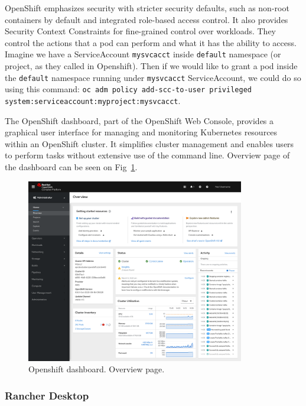 OpenShift emphasizes security with stricter security defaults, such as non-root containers by default and integrated role-based access control. It also provides Security Context Constraints for fine-grained control over workloads. They control the actions that a pod can perform and what it has the ability to access. Imagine we have a ServiceAccount \lstinline{mysvcacct} inside \lstinline{default} namespace (or project, as they called in Openshift). Then if we would like to grant a pod inside the \lstinline{default} namespace running under \lstinline{mysvcacct} ServiceAccount, we could do so using this command: \lstinline{oc adm policy add-scc-to-user privileged system:serviceaccount:myproject:mysvcacct}.

The OpenShift dashboard, part of the OpenShift Web Console, provides a graphical user interface for managing and monitoring Kubernetes resources within an OpenShift cluster. It simplifies cluster management and enables users to perform tasks without extensive use of the command line. Overview page of the dashboard can be seen on Fig~\ref{img:openshift-dashboard}.

\begin{figure}[!hbt]
	\begin{center}
		\includegraphics[width=0.85\textwidth]{images/openshift-dashboard.png}
        \caption{Openshift dashboard. Overview page.}
		\label{img:openshift-dashboard}
	\end{center}
\end{figure}

\subsubsection*{Rancher Desktop}

